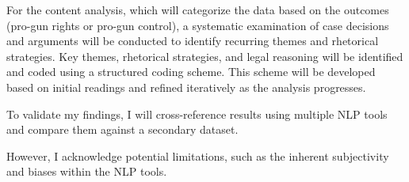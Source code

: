 \documentclass[conference]{IEEEtran}
\begin{document}
For the content analysis, which will categorize the data based on the outcomes (pro-gun rights or pro-gun control), a systematic examination of case decisions and arguments will be conducted to identify recurring themes and rhetorical strategies. Key themes, rhetorical strategies, and legal reasoning will be identified and coded using a structured coding scheme. This scheme will be developed based on initial readings and refined iteratively as the analysis progresses.

To validate my findings, I will cross-reference results using multiple NLP tools and compare them against a secondary dataset.

However, I acknowledge potential limitations, such as the inherent subjectivity and biases within the NLP tools.
\end{document}
